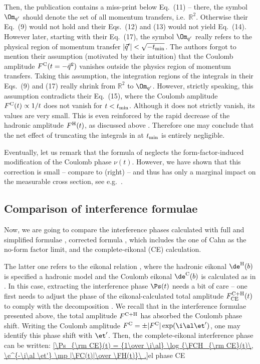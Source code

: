 Then, the publication  contains a miss-print below Eq.~(11) -- there, the symbol $\Om_{q'}$ should denote the set of all momentum transfers, i.e.~$\mathbb{R}^2$. Otherwise their Eq.~(9) would not hold and their Eqs.~(12) and (13) would not yield Eq.~(14). However later, starting with their Eq.~(17), the symbol $\Om_{q'}$ really refers to the physical region of momentum transfer $|\vec q'| < \sqrt{-t_{\rm min}}$. The authors forgot to mention their assumption (motivated by their intuition) that the Coulomb amplitude $F^{\rm C}(t = -\vec q^2)$ vanishes outside the physics region of momentum transfers. Taking this assumption, the integration regions of the integrals in their Eqs.~(9) and (17) really shrink from $\mathbb R^2$ to $\Om_{q'}$. However, strictly speaking, this assumption contradicts their Eq.~(15), where the Coulomb amplitude $F^{\rm C}(t) \propto 1/t$ does not vanish for $t < t_{\rm min}$. Although it does not strictly vanish, its values are very small. This is even reinforced by the rapid decrease of the hadronic amplitude $F^{\rm H}(t)$, as discussed above . Therefore one may conclude that the net effect of truncating the integrals in  at $t_{\rm min}$ is entirely negligible.

Eventually, let us remark that the formula of \KaL{} neglects the form-factor-induced modification of the Coulomb phase $\nu(t)$. However, we have shown that this correction is small -- compare  to  (right) -- and thus has only a marginal impact on the measurable cross section, see e.g.~.


\subsection[int cmp]{Comparison of interference formulae}

Now, we are going to compare the interference phases calculated with
\> full and simplified \WY{} formulae ,
\> corrected \KL{} formula , which includes the one of Cahn as the no-form factor limit, and
\> the complete-eikonal (CE) calculation.

\noindent The latter one refers to the eikonal relation , where the hadronic eikonal $\de^{\rm H}(b)$ is specified a hadronic model and the Coulomb eikonal $\de^{\rm C}(b)$ is calculated as in . In this case, extracting the interference phase $\Ps(t)$ needs a bit of care -- one first needs to adjust the phase of the eikonal-calculated total amplitude $F^{\rm C+H}_{\rm CE}(t)$ to comply with the decomposition . We recall that in the interference formulae presented above, the total amplitude $F^{\rm C+H}$ has absorbed the Coulomb phase shift. Writing the Coulomb amplitude $\FC = \pm |\FC| \exp(\i\al\et')$, one may identify this phase shift with $\et'$. Then, the complete-eikonal interference phase can be written:
\eqref{\Ps_{\rm CE}(t) = {1\over \i\al} \log {\FCH_{\rm CE}(t)\, \e^{-\i\al \et'} \mp |\FC(t)|\over \FH(t)}\ .}{el phase CE}

